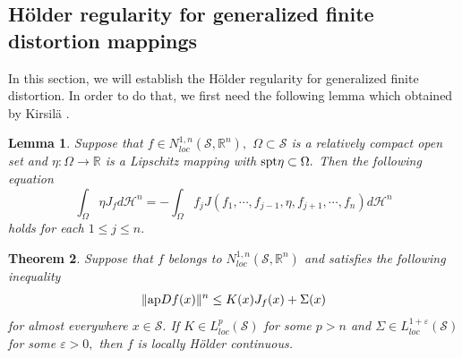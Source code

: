 \documentclass[11pt,twoside]{article}
\newtheorem{thm}{Theorem}[section]
\newtheorem{lem}[thm]{Lemma}
\theoremstyle{definition}
\theoremstyle{remark}
\begin{document}
\subsection{H\"{o}lder regularity for generalized finite distortion mappings}
In this section, we will establish the H\"{o}lder regularity for generalized finite distortion. In order to do that, we first need the following lemma which obtained by Kirsil\"{a} \cite[Theorem 3.1]{Kir16}.
\begin{lem}{\rm \cite[Theorem 3.1]{Kir16}}\label{Kir16}
  Suppose that $f\in N_{loc}^{1,n}(\mathcal{S},\mathbb{R}^{n}),$ $\Omega\subset\mathcal{S}$ is a relatively compact open set and $\eta:\Omega\rightarrow \mathbb{R}$ is a Lipschitz mapping with 
  ${\rm spt}\eta\subset\Omega.$ Then the following equation
  \begin{equation}
  \int_{\Omega}\eta J_{f}d\mathcal{H}^{n}=-\int_{\Omega}f_{j}J(f_{1},\cdots,f_{j-1},\eta,f_{j+1},\cdots,f_{n})d\mathcal{H}^{n}
  \end{equation}
  holds for each $1\leq j\leq n.$
\end{lem}
\begin{thm}\label{thm20}
Suppose that $f$ belongs to  $N_{loc}^{1,n}(\mathcal{S},\mathbb{R}^{n})$ and satisfies the following inequality
\begin{equation}
\| {\rm ap}Df(x)\|^{n}\leq K(x)J_{f}(x)+\Sigma(x)
\end{equation}
for almost everywhere $x\in\mathcal{S}.$ If $K\in L_{loc}^{p}(\mathcal{S})$ for some $p>n$ and  $\Sigma\in L_{loc}^{1+\varepsilon}(\mathcal{S})$ for some $\varepsilon>0,$ then $f$ is locally H\"{o}lder continuous.
\end{thm}
\end{document}

